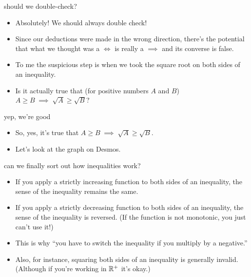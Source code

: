 \documentclass[landscape]{beamer}
\begin{document}
\begin{frame}{should we double-check?}
\begin{itemize}
\item Absolutely! We should always double check! \pause
\item Since our deductions were made in the wrong direction, \pause \newline
there's the potential that what we thought was a $\iff$ is really a $\implies$ and its converse is false. \pause
\item To me the suspicious step is when we took the square root on both sides of an inequality. \pause
\item Is it actually true that (for positive numbers $A$ and $B$) $A \geq B \; \implies \; \sqrt{A} \geq \sqrt{B}$? 
\end{itemize}
\end{frame}

\begin{frame}{yep, we're good}
\begin{itemize}
\item So, yes, it's true that $A \geq B \; \implies \; \sqrt{A} \geq \sqrt{B}$. \pause
\item Let's look at the graph on Desmos.
\end{itemize}
\end{frame}
 
\begin{frame}{can we finally sort out how inequalities work?}
\begin{itemize}
\item If you apply a strictly increasing function to both sides of an inequality, \pause \newline
the sense of the inequality remains the same. \pause
\item If you apply a strictly decreasing function to both sides of an inequality, \pause \newline
the sense of the inequality is reversed. \pause \newline
(If the function is not monotonic, you just can't use it!)\pause 
\item This is why ``you have to switch the inequality if you multiply by a negative.'' \pause
\item Also, for instance, squaring both sides of an inequality is generally invalid. \pause \newline
(Although if you're working in ${\mathbb R}^+$ it's okay.) 
\end{itemize}
\end{frame}
\end{document}
